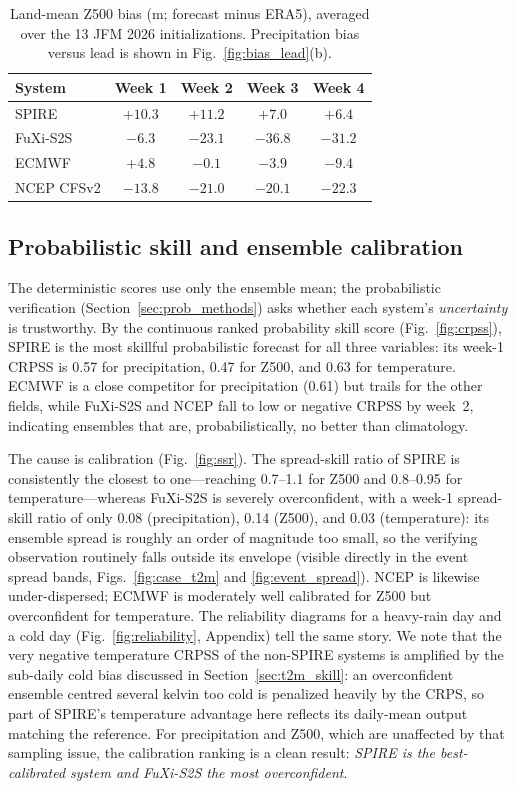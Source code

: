 \documentclass[11pt]{article}
\begin{document}
\begin{table}[t]
  \centering
  \caption{Land-mean Z500 bias (m; forecast minus ERA5), averaged over
  the 13 JFM 2026 initializations. Precipitation bias versus lead is
  shown in Fig.~\ref{fig:bias_lead}(b).}
  \label{tab:bias}
  \begin{tabular}{lcccc}
    \toprule
    System & Week 1 & Week 2 & Week 3 & Week 4 \\
    \midrule
    SPIRE        & $+10.3$ & $+11.2$ & $+7.0$ & $+6.4$ \\
    FuXi-S2S     & $-6.3$ & $-23.1$ & $-36.8$ & $-31.2$ \\
    ECMWF        & $+4.8$ & $-0.1$ & $-3.9$ & $-9.4$ \\
    NCEP CFSv2   & $-13.8$ & $-21.0$ & $-20.1$ & $-22.3$ \\
    \bottomrule
  \end{tabular}
\end{table}

\subsection{Probabilistic skill and ensemble calibration}\label{sec:prob}

The deterministic scores use only the ensemble mean; the probabilistic
verification (Section~\ref{sec:prob_methods}) asks whether each system's
\emph{uncertainty} is trustworthy. By the continuous ranked probability
skill score (Fig.~\ref{fig:crpss}), SPIRE is the most skillful
probabilistic forecast for all three variables: its week-1 CRPSS is 0.57
for precipitation, 0.47 for Z500, and 0.63 for temperature. ECMWF is a
close competitor for precipitation (0.61) but trails for the other
fields, while FuXi-S2S and NCEP fall to low or negative CRPSS by week~2,
indicating ensembles that are, probabilistically, no better than
climatology.

The cause is calibration (Fig.~\ref{fig:ssr}). The spread-skill ratio of
SPIRE is consistently the closest to one---reaching 0.7--1.1 for Z500 and
0.8--0.95 for temperature---whereas FuXi-S2S is severely overconfident,
with a week-1 spread-skill ratio of only 0.08 (precipitation), 0.14
(Z500), and 0.03 (temperature): its ensemble spread is roughly an order
of magnitude too small, so the verifying observation routinely falls
outside its envelope (visible directly in the event spread bands,
Figs.~\ref{fig:case_t2m} and \ref{fig:event_spread}). NCEP is likewise under-dispersed; ECMWF is
moderately well calibrated for Z500 but overconfident for temperature.
The reliability diagrams for a heavy-rain day and a cold day
(Fig.~\ref{fig:reliability}, Appendix) tell the same story. We note that
the very negative temperature CRPSS of the non-SPIRE systems is amplified
by the sub-daily cold bias discussed in Section~\ref{sec:t2m_skill}: an
overconfident ensemble centred several kelvin too cold is penalized
heavily by the CRPS, so part of SPIRE's temperature advantage here
reflects its daily-mean output matching the reference. For precipitation
and Z500, which are unaffected by that sampling issue, the calibration
ranking is a clean result: \emph{SPIRE is the best-calibrated system and
FuXi-S2S the most overconfident}.
\end{document}
